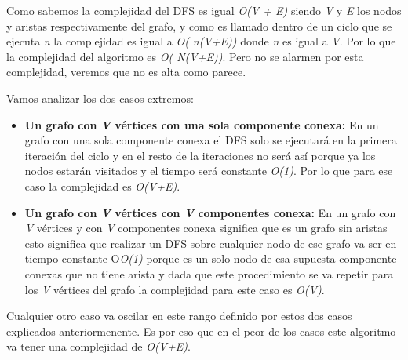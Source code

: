Como sabemos la complejidad del DFS es igual {\em O(V + E)} siendo {\em V} y {\em E} los nodos y aristas respectivamente del grafo, y como es llamado dentro de un ciclo que se ejecuta {\em n} la complejidad es igual a {\em O( n(V+E))} donde {\em n} es igual a {\em V}. Por lo que la complejidad del algoritmo es {\em O( N(V+E))}. Pero no se alarmen por esta complejidad, veremos que no es alta como parece.

Vamos analizar los dos casos extremos:

\begin{itemize}
	\item {\bf Un grafo con {\em V} vértices con una sola componente conexa:} En un grafo con una sola componente conexa el DFS solo se ejecutará en la primera iteración del ciclo y en el resto de la iteraciones no será así porque ya los nodos estarán visitados y el tiempo será constante {\em O(1)}. Por lo que para ese caso la complejidad es {\em O(V+E)}.
	
	\item {\bf Un grafo con {\em V} vértices con {\em V} componentes conexa:} En un grafo con {\em V} vértices y con {\em V} componentes conexa significa que es un grafo sin aristas esto significa que realizar un DFS sobre cualquier nodo de ese grafo va ser en tiempo constante O{\em O(1)} porque es un solo nodo de esa supuesta componente conexas que no tiene arista y dada que este procedimiento se va repetir para los {\em V} vértices del grafo la complejidad para este caso es {\em O(V)}.
	
\end{itemize}

Cualquier otro caso va oscilar en este rango definido por estos dos casos explicados anteriormenente. Es por eso que en el peor de los casos este algoritmo va tener una complejidad
de {\em O(V+E)}.